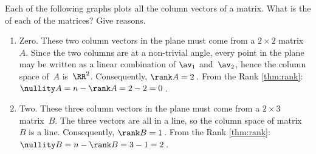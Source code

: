\begin{example} 
Each of the following graphs plots all the column vectors of a matrix. What is the  of each of the matrices?  Give reasons.
\begin{enumerate}
\item {}
\begin{solution} 
Zero.
These two column vectors in the plane must come from a \(2\times2\) matrix~\(A\).
Since the two columns are at a non-trivial angle, every point in the plane may be written as a linear combination of \(\av_1\) and~\(\av_2\), hence the column space of~\(A\) is~\(\RR^2\).
Consequently, \(\rank A=2\)\,. 
From the Rank \cref{thm:rank}: \(\nullity A=n-\rank A=2-2=0\)\,. 
\end{solution}


\item {}
\begin{solution} 
Two.
These three column vectors in the plane must come from a \(2\times3\) matrix~\(B\).
The three vectors are all in a line, so the column space of matrix~\(B\) is a line.
Consequently, \(\rank B=1\)\,. 
From the Rank \cref{thm:rank}: \(\nullity B=n-\rank B=3-1=2\)\,. 
\end{solution}



\end{enumerate}
\end{example}
